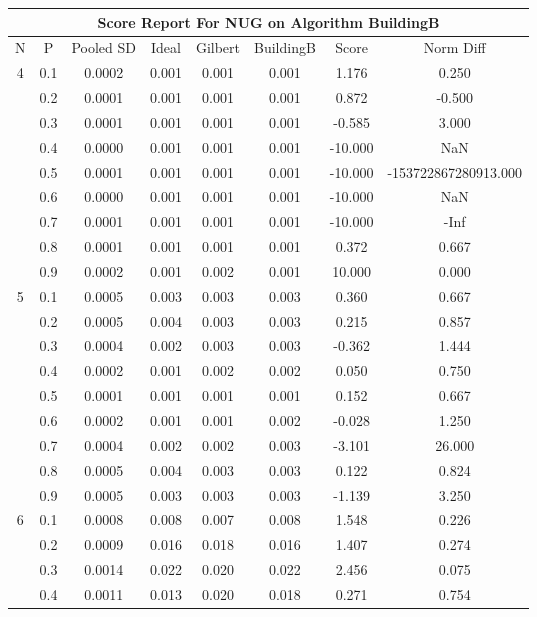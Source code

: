 \documentclass[11pt,a4paper]{report}
\begin{document}
\begin{longtable}{ | c | c || c | c | c | c | c | c | }
\hline
\multicolumn{8}{|c|}{ Score Report For NUG on Algorithm BuildingB} \\
\hline
N & P & Pooled SD &  Ideal &  Gilbert & BuildingB  & Score & Norm Diff \\
 \hline
 \hline
 \endhead
\multirow{9}{*}{4} & 0.1 & 0.0002 & 0.001 & 0.001 & 0.001 & 1.176 & 0.250 \\
 & 0.2 & 0.0001 & 0.001 & 0.001 & 0.001 & 0.872 & -0.500 \\
 & 0.3 & 0.0001 & 0.001 & 0.001 & 0.001 & -0.585 & 3.000 \\
 & 0.4 & 0.0000 & 0.001 & 0.001 & 0.001 & -10.000 & NaN \\
 & 0.5 & 0.0001 & 0.001 & 0.001 & 0.001 & -10.000 & -153722867280913.000 \\
 & 0.6 & 0.0000 & 0.001 & 0.001 & 0.001 & -10.000 & NaN \\
 & 0.7 & 0.0001 & 0.001 & 0.001 & 0.001 & -10.000 & -Inf \\
 & 0.8 & 0.0001 & 0.001 & 0.001 & 0.001 & 0.372 & 0.667 \\
 & 0.9 & 0.0002 & 0.001 & 0.002 & 0.001 & 10.000 & 0.000 \\
 \hline
\multirow{9}{*}{5} & 0.1 & 0.0005 & 0.003 & 0.003 & 0.003 & 0.360 & 0.667 \\
 & 0.2 & 0.0005 & 0.004 & 0.003 & 0.003 & 0.215 & 0.857 \\
 & 0.3 & 0.0004 & 0.002 & 0.003 & 0.003 & -0.362 & 1.444 \\
 & 0.4 & 0.0002 & 0.001 & 0.002 & 0.002 & 0.050 & 0.750 \\
 & 0.5 & 0.0001 & 0.001 & 0.001 & 0.001 & 0.152 & 0.667 \\
 & 0.6 & 0.0002 & 0.001 & 0.001 & 0.002 & -0.028 & 1.250 \\
 & 0.7 & 0.0004 & 0.002 & 0.002 & 0.003 & -3.101 & 26.000 \\
 & 0.8 & 0.0005 & 0.004 & 0.003 & 0.003 & 0.122 & 0.824 \\
 & 0.9 & 0.0005 & 0.003 & 0.003 & 0.003 & -1.139 & 3.250 \\
 \hline
\multirow{9}{*}{6} & 0.1 & 0.0008 & 0.008 & 0.007 & 0.008 & 1.548 & 0.226 \\
 & 0.2 & 0.0009 & 0.016 & 0.018 & 0.016 & 1.407 & 0.274 \\
 & 0.3 & 0.0014 & 0.022 & 0.020 & 0.022 & 2.456 & 0.075 \\
 & 0.4 & 0.0011 & 0.013 & 0.020 & 0.018 & 0.271 & 0.754 \\

\end{longtable}
\end{document}
